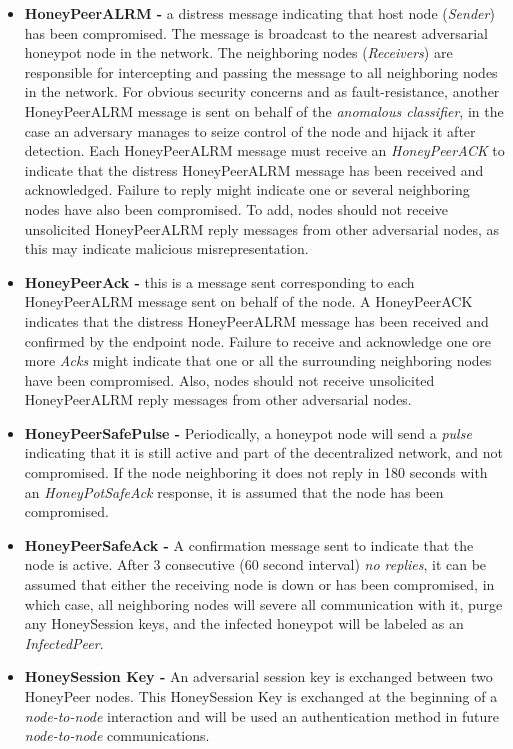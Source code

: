 \documentclass[grad,lot,lof,11pt,oneside,onehalfspace]{RUthesis}
\begin{document}
\begin{itemize}
	\item \textbf{HoneyPeerALRM -} a distress message indicating that host node (\textit{Sender}) has been compromised. The message is broadcast to the nearest adversarial honeypot node in the network. The neighboring nodes (\textit{Receivers}) are responsible for intercepting and passing the message to all neighboring nodes in the network. For obvious security concerns and as fault-resistance,  another HoneyPeerALRM message is sent on behalf of the \textit{anomalous classifier}, in the case an adversary manages to seize control of the node and hijack it after detection. Each HoneyPeerALRM message must receive an \textit{HoneyPeerACK} to indicate that the distress HoneyPeerALRM message has been received and acknowledged. Failure to reply might indicate one or several neighboring nodes have also been compromised. To add, nodes should not receive unsolicited HoneyPeerALRM reply messages from other adversarial nodes, as this may indicate malicious misrepresentation. 
	\item \textbf{HoneyPeerAck -} this is a message sent corresponding to each HoneyPeerALRM message sent on behalf of the node. A  HoneyPeerACK indicates that the distress HoneyPeerALRM message has been received and confirmed by the endpoint node. Failure to receive and acknowledge one ore more \textit{Acks} might indicate that one or all the surrounding neighboring nodes have been compromised. Also, nodes should not receive unsolicited HoneyPeerALRM reply messages from other adversarial nodes. 
	\item \textbf{HoneyPeerSafePulse -}
	Periodically, a honeypot node will send a \textit{pulse} indicating that it is still active and part of the decentralized network, and not compromised. If the node neighboring it does not reply in 180 seconds with an \textit{HoneyPotSafeAck} response, it is assumed that the node has been compromised. 
	\item \textbf{HoneyPeerSafeAck -}
	A confirmation message sent to indicate  that the node is active. After 3 consecutive (60 second interval) \textit{no replies}, it can be assumed that either the receiving node is down or has been compromised, in which case, all neighboring nodes will severe all communication with it, purge any HoneySession keys, and the infected honeypot will be labeled as an \textit{InfectedPeer}.
	\item \textbf{HoneySession Key -}
	An adversarial session key is exchanged between two HoneyPeer nodes. This HoneySession Key is exchanged at the beginning of a \textit{node-to-node} interaction and will be used an authentication method in future \textit{node-to-node} communications. 
\end{itemize}
\end{document}
